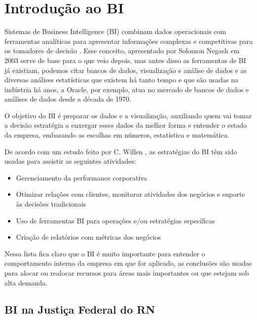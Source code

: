 \chapter{Introdução ao BI}\label{cap_trabalho_academico}


Sistemas de Business Intelligence (BI) combinam dados operacionais com ferramentas analíticas para apresentar informações complexas e competitivas para os tomadores de decisão \cite{negash1}. Esse conceito, apresentado por Solomon Negash em 2003 serve de base para o que veio depois, mas antes disso as ferramentas de BI já existiam, podemos citar bancos de dados, visualização e análise de dados e as diversas análises estatísticas que existem há tanto tempo e que são usadas na indústria há anos, a Oracle, por exemplo, atua no mercado de bancos de dados e análises de dados desde a década de 1970. 

O objetivo do BI é preparar os dados e a visualização, auxiliando quem vai tomar a decisão estratégia a enxergar esses dados da melhor forma e entender o estado da empresa, embasando as escolhas em números, estatística e matemática. 

De acordo com um estudo feito por C. Willen \cite{willen1}, as estratégias do BI têm sido usadas para assistir as seguintes atividades:

\begin{itemize}
	\item Gerenciamento da performance corporativa
	\item Otimizar relações com clientes, monitorar atividades dos negócios e suporte às decisões tradicionais
	\item Uso de ferramentas BI para operações e/ou estratégias específicas
	\item Criação de relatórios com métricas dos negócios
\end{itemize}

Nessa lista fica claro que o BI é muito importante para entender o comportamento interno da empresa em que for aplicado, as conclusões são usadas para alocar ou realocar recursos para áreas mais importantes ou que estejam sob alta demanda.

\section{BI na Justiça Federal do RN}

